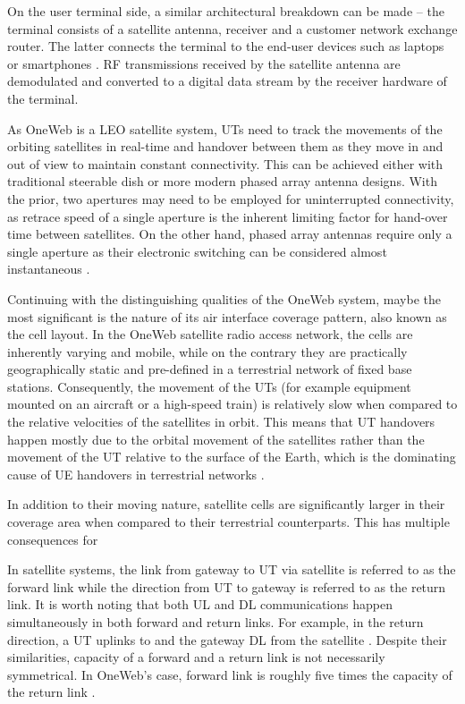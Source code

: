 \documentclass[english, 12pt, a4paper, elec, utf8, a-1b, online]{aaltothesis}
\begin{document}
On the user terminal side, a similar architectural breakdown can be made -- the terminal consists of a satellite antenna, receiver and a customer network exchange router.
The latter connects the terminal to the end-user devices such as laptops or smartphones \cite{henri2020oneweb}. RF transmissions received by the satellite antenna are demodulated and converted to a digital data stream by the receiver hardware of the terminal.

As OneWeb is a LEO satellite system, UTs need to track the movements of the orbiting satellites in real-time and handover between them as they move in and out of view to maintain constant connectivity.
This can be achieved either with traditional steerable dish or more modern phased array antenna designs.
With the prior, two apertures may need to be employed for uninterrupted connectivity, as retrace speed of a single aperture is the inherent limiting factor for hand-over time between satellites.
On the other hand, phased array antennas require only a single aperture as their electronic switching can be considered almost instantaneous \cite{worldvu2016loi}.

Continuing with the distinguishing qualities of the OneWeb system, maybe the most significant is the nature of its air interface coverage pattern, also known as the cell layout.
In the OneWeb satellite radio access network, the cells are inherently varying and mobile, while on the contrary they are practically geographically static and pre-defined in a terrestrial network of fixed base stations.
Consequently, the movement of the UTs (for example equipment mounted on an aircraft or a high-speed train) is relatively slow when compared to the relative velocities of the satellites in orbit.
This means that UT handovers happen mostly due to the orbital movement of the satellites rather than the movement of the UT relative to the surface of the Earth, which is the dominating cause of UE handovers in terrestrial networks \cite{corson2019admission}.

In addition to their moving nature, satellite cells are significantly larger in their coverage area when compared to their terrestrial counterparts.
This has multiple consequences for \cite{corson2019admission}

In satellite systems, the link from gateway to UT via satellite is referred to as the forward link while the direction from UT to gateway is referred to as the return link.
It is worth noting that both UL and DL communications happen simultaneously in both forward and return links.
For example, in the return direction, a UT uplinks to and the gateway DL from the satellite \cite{kymeta2019link}.
Despite their similarities, capacity of a forward and a return link is not necessarily symmetrical.
In OneWeb's case, forward link is roughly five times the capacity of the return link \cite{worldvu2016loi, portillo2019technical}.
\end{document}
